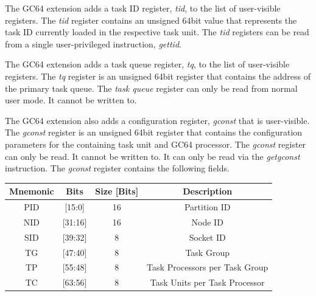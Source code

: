 \documentclass{article}
\begin{document}
\begin{center}
\end{center}

The GC64 extension adds a task ID register, \emph{tid}, to the list of user-visible registers.  The \emph{tid} register contains an unsigned 64bit value that represents the task ID currently loaded in the respective task unit.  The \emph{tid} registers can be read from a single user-privileged instruction, \emph{gettid}.  

\begin{center}
\end{center}

The GC64 extension adds a task queue register, \emph{tq}, to the list of user-visible registers.  The \emph{tq} register is an unsigned 64bit register that contains the address of the primary task queue.  The \emph{task queue} register can only be read from normal user mode.  It cannot be written to.

\begin{center}
\end{center}

The GC64 extension also adds a configuration register, \emph{gconst} that is user-visible.  The \emph{gconst} register is an unsigned 64bit register that contains the configuration parameters for the containing task unit and GC64 processor.  The \emph{gconst} register can only be read.  It cannot be written to.  It can only be read via the \emph{getgconst} instruction.  The \emph{gconst} register contains the following fields.  

\begin{center}
\begin{tabular}{| c | c | c | c |}
\hline
Mnemonic & Bits & Size [Bits] & Description \\ 
\hline \hline
PID & [15:0] & 16 & Partition ID \\
\hline
NID & [31:16] & 16 & Node ID \\
\hline
SID & [39:32] & 8 & Socket ID \\
\hline
TG & [47:40] & 8 & Task Group \\
\hline 
TP & [55:48] & 8 & Task Processors per Task Group \\
\hline 
TC & [63:56] & 8 & Task Units per Task Processor \\
\hline 

\end{tabular}
\end{center} 
\end{document}
